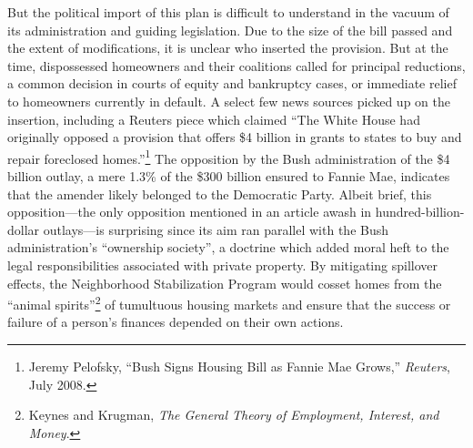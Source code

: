 \documentclass[12pt,oneside]{psthesis}
\begin{document}
But the political import of this plan is difficult to understand in the vacuum of its administration and guiding legislation.
Due to the size of the bill passed and the extent of modifications, it is unclear who inserted the provision.
But at the time, dispossessed homeowners and their coalitions called for principal reductions, a common decision in courts of equity and bankruptcy cases, or immediate relief to homeowners currently in default.
A select few news sources picked up on the insertion, including a Reuters piece which claimed ``The White House had originally opposed a provision that offers \$4 billion in grants to states to buy and repair foreclosed homes.''\footnote{Jeremy Pelofsky, ``Bush Signs Housing Bill as Fannie Mae Grows,'' \emph{Reuters}, July 2008.}
The opposition by the Bush administration of the \$4 billion outlay, a mere 1.3\% of the \$300 billion ensured to Fannie Mae, indicates that the amender likely belonged to the Democratic Party.
Albeit brief, this opposition---the only opposition mentioned in an article awash in hundred-billion-dollar outlays---is surprising since its aim ran parallel with the Bush administration's ``ownership society'', a doctrine which added moral heft to the legal responsibilities associated with private property.
By mitigating spillover effects, the Neighborhood Stabilization Program would cosset homes from the ``animal spirits''\footnote{Keynes and Krugman, \emph{The General Theory of Employment, Interest, and Money}.} of tumultuous housing markets and ensure that the success or failure of a person's finances depended on their own actions.
\end{document}
